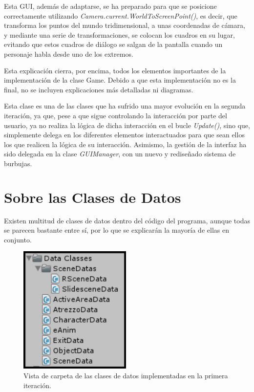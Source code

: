 \begin{itemize}
	Esta GUI, además de adaptarse, se ha preparado para que se posicione correctamente utilizando \textit{Camera.current.WorldToScreenPoint()}, es decir, que transforma los puntos del mundo tridimensional, a unas coordenadas de cámara, y mediante una serie de transformaciones, se colocan los cuadros en su lugar, evitando que estos cuadros de diálogo se salgan de la pantalla cuando un personaje habla desde uno de los extremos.
\end{itemize}

Esta explicación cierra, por encima, todos los elementos importantes de la implementación de la clase Game. Debido a que esta implementación no es la final, no se incluyen explicaciones más detalladas ni diagramas.

Esta clase es una de las clases que ha sufrido una mayor evolución en la segunda iteración, ya que, pese a que sigue controlando la interacción por parte del usuario, ya no realiza la lógica de dicha interacción en el bucle \textit{Update()}, sino que, simplemente delega en los diferentes elementos interactuados para que sean ellos los que realicen la lógica de su interacción. Asimismo, la gestión de la interfaz ha sido delegada en la clase \textit{GUIManager}, con un nuevo y rediseñado sistema de burbujas.

\section{Sobre las Clases de Datos}

Existen multitud de clases de datos dentro del código del programa, aunque todas se parecen bastante entre sí, por lo que se explicarán la mayoría de ellas en conjunto.

\begin{figure}[htb]
	\includegraphics[height=2.5in]{figures/it1/dataclasses.png}
	\caption[Clases de Datos - Prototipo 1]{Vista de carpeta de las clases de datos implementadas en la primera iteración.}
	\label{dataclassesit1}
\end{figure}

